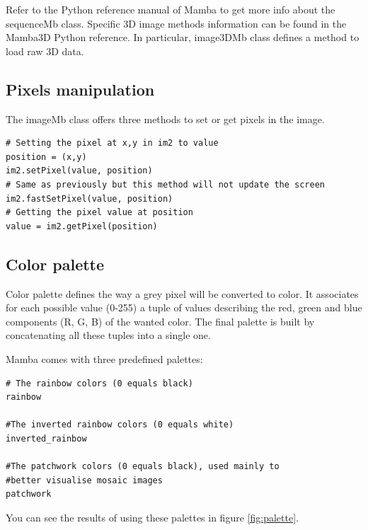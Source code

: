 \documentclass[a4paper,10pt,oneside]{article}
\begin{document}
Refer to the Python reference manual of Mamba to get more info about the 
sequenceMb class. Specific 3D image methods information can be found in the
Mamba3D Python reference. In particular, image3DMb class defines a method
to load raw 3D data.

\subsection{Pixels manipulation}

The imageMb class offers three methods to set or get pixels in the image.

\lstset{language=Python}
\begin{lstlisting}
# Setting the pixel at x,y in im2 to value
position = (x,y)
im2.setPixel(value, position)
# Same as previously but this method will not update the screen
im2.fastSetPixel(value, position)
# Getting the pixel value at position
value = im2.getPixel(position)
\end{lstlisting}

\subsection{Color palette}

Color palette defines the way a grey pixel will be converted to color. It 
associates for each possible value (0-255) a tuple of values describing the red, 
green and blue components (R, G, B) of the wanted color. The final palette is 
built by concatenating all these tuples into a single one.

Mamba comes with three predefined palettes:

\lstset{language=Python}
\begin{lstlisting}
# The rainbow colors (0 equals black)
rainbow

#The inverted rainbow colors (0 equals white)
inverted_rainbow

#The patchwork colors (0 equals black), used mainly to
#better visualise mosaic images
patchwork
\end{lstlisting}

You can see the results of using these palettes in figure \ref{fig:palette}.
\end{document}
